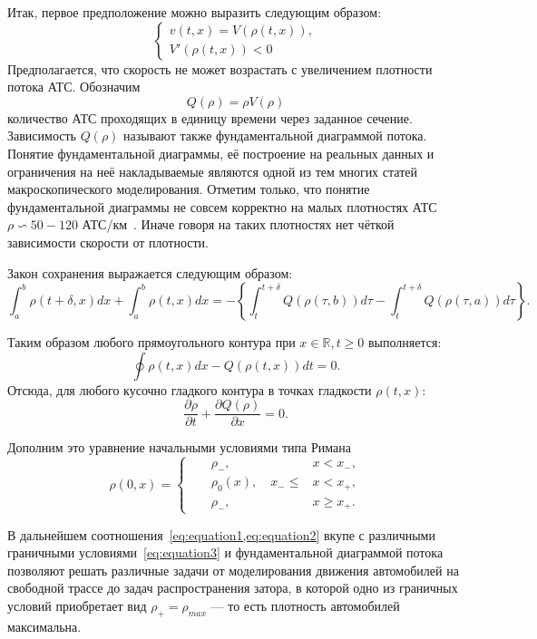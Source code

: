 Итак, первое предположение можно выразить следующим образом:
\begin{equation}
    \label{eq:equation1}
    \left\{
    \begin{array}{rl}
        v(t, x) = V(\rho(t, x)),\\
        V'(\rho(t, x)) < 0
    \end{array}
    \right.  
\end{equation}
Предполагается, что скорость не может возрастать с увеличением плотности потока АТС.
Обозначим
\[
    Q(\rho) = \rho V(\rho)
\]
количество АТС проходящих в единицу времени через заданное сечение.
Зависимость \( Q(\rho) \) называют также фундаментальной диаграммой потока.
Понятие фундаментальной диаграммы, её построение на реальных данных и ограничения на неё накладываемые являются одной из тем многих статей макроскопического моделирования.
Отметим только, что понятие фундаментальной диаграммы не совсем корректно на малых плотностях АТС \( \rho \backsim 50-120 \) АТС/км~\cite{kerner2009introduction}. 
Иначе говоря на таких плотностях нет чёткой зависимости скорости от плотности.

Закон сохранения выражается следующим образом:
\[
    \int_{a}^{b} \rho(t + \delta, x)dx + \int_{a}^{b} \rho(t, x)dx = -\left\{\int_{t}^{t + \delta} Q(\rho(\tau, b))d\tau - \int_{t}^{t + \delta} Q(\rho(\tau, a))d\tau \right\}.
\]

Таким образом любого прямоугольного контура при $x\in \mathbb{R}, t\geq 0$ выполняется:
\[
    \oint \rho(t, x)dx - Q(\rho(t, x))dt = 0.
\]
Отсюда, для любого кусочно гладкого контура в точках гладкости \( \rho(t, x) \):
\begin{equation}
    \label{eq:equation2}
    \frac{\partial \rho}{\partial t} + \frac{\partial Q(\rho)}{\partial x} = 0.
\end{equation}

Дополним это уравнение начальными условиями типа Римана
\begin{equation}
    \label{eq:equation3}
    \rho(0, x) = 
    \left\{
    \begin{alignedat}{3}
        &&\rho_{-},\quad &x<x_{-},  \\
        &&\rho_{0}(x),\quad x_{-}\leq &x<x_{+},  \\
        &&\rho_{-},\quad &x\geq x_{+}.
    \end{alignedat}
    \right.    
\end{equation}

В дальнейшем соотношения~\cref{eq:equation1,eq:equation2} вкупе с различными граничными условиями~\cref{eq:equation3} и фундаментальной диаграммой потока позволяют решать различные задачи от моделирования движения автомобилей на свободной трассе до задач распространения затора, в которой одно из граничных условий приобретает вид \(\rho_{+} = \rho_{max}\) --- то есть плотность автомобилей максимальна.


